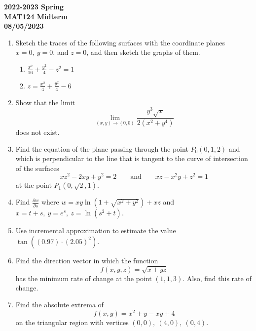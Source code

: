 \documentclass[a4paper, 12pt]{article}
\renewcommand{\headrulewidth}{0pt}
\begin{document}
\pagestyle{empty}

\begin{center}
\textbf{2022-2023 Spring \\MAT124 Midterm\\08/05/2023}
\end{center}

\begin{enumerate}[leftmargin=*,label=\textbf{\arabic*.}]
\item Sketch the traces of the following surfaces with the coordinate planes $x=0,\:y=0$, and $z=0$, and then sketch the graphs of them.

\begin{enumerate}[leftmargin=*,label=\textbf{\alph*.}]
\item $\displaystyle\frac{x^2}{16}+\frac{y^2}4-z^2=1$
\item $\displaystyle z=\frac{x^2}4+\frac{y^2}4-6$
\end{enumerate}

\item Show that the limit
\[\lim_{(x,y)\to(0,0)}\frac{y^3\sqrt x}{2\left(x^2+y^4\right)}\]
does not exist.

\item Find the equation of the plane passing through the point $P_0(0,1,2)$ and which is perpendicular to the line that is tangent to the curve of intersection of the surfaces
\[xz^2-2xy+y^2=2\qquad\text{and}\qquad xz-x^2y+z^2=1\]
at the point $P_1\left(0,\sqrt2, 1\right)$.

\item Find $\displaystyle\frac{\partial w}{\partial s}$ where $w=xy\ln\left(1+\sqrt{x^2+y^2}\right)+xz$ and $x=t+s,\:y={e}^s,\:z=\ln\left(s^2+t\right)$.

\item Use incremental approximation to estimate the value $\tan\left((0.97)\cdot(2.05)^2\right)$.

\item Find the direction vector in which the function
\[f(x,y,z)=\sqrt{x+yz}\]
has the minimum rate of change at the point $(1,1,3)$. Also, find this rate of change.

\item Find the absolute extrema of
\[f(x,y)=x^2+y-xy+4\]
on the triangular region with vertices $(0,0),\:(4,0),\:(0,4)$.
\end{enumerate}

\newpage
\pagestyle{fancy}
\renewcommand{\headrulewidth}{1pt}
\end{document}
